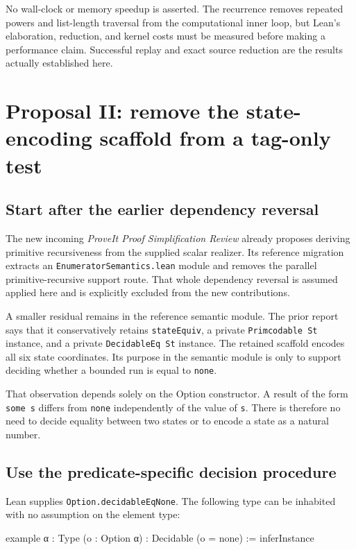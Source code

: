 \documentclass[11pt,a4paper]{article}
\newcommand{\code}[1]{\texttt{#1}}
\begin{document}
No wall-clock or memory speedup is asserted. The recurrence removes repeated powers and list-length traversal from the computational inner loop, but Lean's elaboration, reduction, and kernel costs must be measured before making a performance claim. Successful replay and exact source reduction are the results actually established here.

\section{Proposal II: remove the state-encoding scaffold from a tag-only test}

\subsection{Start after the earlier dependency reversal}

The new incoming \emph{ProveIt Proof Simplification Review} already proposes deriving primitive recursiveness from the supplied scalar realizer. Its reference migration extracts an \code{EnumeratorSemantics.lean} module and removes the parallel primitive-recursive support route. That whole dependency reversal is assumed applied here and is explicitly excluded from the new contributions.\cite{priorreview}

A smaller residual remains in the reference semantic module. The prior report says that it conservatively retains \code{stateEquiv}, a private \code{Primcodable St} instance, and a private \code{DecidableEq St} instance. The retained scaffold encodes all six state coordinates. Its purpose in the semantic module is only to support deciding whether a bounded run is equal to \code{none}.

That observation depends solely on the Option constructor. A result of the form \code{some s} differs from \code{none} independently of the value of \code{s}. There is therefore no need to decide equality between two states or to encode a state as a natural number.

\subsection{Use the predicate-specific decision procedure}

Lean supplies \code{Option.decidableEqNone}. The following type can be inhabited with no assumption on the element type:
\begin{Lean}
example {α : Type} (o : Option α) : Decidable (o = none) :=
  inferInstance
\end{Lean}
\end{document}
